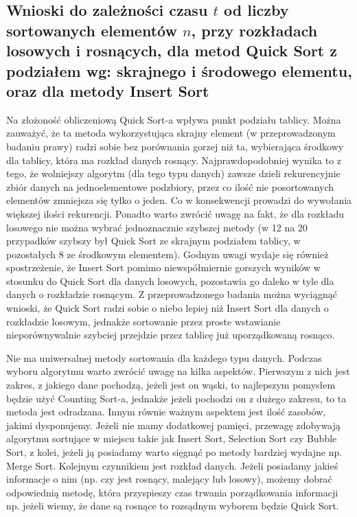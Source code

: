 \documentclass[polish,polish,a4paper]{article}
\begin{document}
\begin{spacing}{1.5}
\subsection{Wnioski do zależności czasu $t$ od liczby sortowanych elementów $n$, przy rozkładach losowych i rosnących, dla metod Quick Sort z podziałem wg: skrajnego i środowego elementu, oraz dla metody Insert Sort}

Na złożoność obliczeniową Quick Sort-a wpływa punkt podziału tablicy. Można zauważyć, że ta metoda wykorzystująca skrajny element (w przeprowadzonym badaniu prawy) radzi sobie bez porównania gorzej niż ta, wybierająca środkowy dla tablicy, która ma rozkład danych rosnący. Najprawdopodobniej wynika to z tego, że wolniejszy algorytm (dla tego typu danych) zawsze dzieli rekurencyjnie zbiór danych na jednoelementowe podzbiory, przez co ilość nie posortowanych elementów zmniejsza się tylko o jeden. Co w konsekwencji prowadzi do wywołania większej ilości rekurencji. Ponadto warto zwrócić uwagę na fakt, że dla rozkładu losowego nie można wybrać jednoznacznie szybszej metody (w 12 na 20 przypadków szybszy był Quick Sort ze skrajnym podziałem tablicy, w pozostałych 8 ze środkowym elementem). Godnym uwagi wydaje się również spostrzeżenie, że Insert Sort pomimo niewspółmiernie gorszych wyników w stosunku do Quick Sort dla danych losowych, pozostawia go daleko w tyle dla danych o rozkładzie rosnącym. Z przeprowadzonego badania można wyciągnąć wnioski, że Quick Sort radzi sobie o niebo lepiej niż Insert Sort dla danych o rozkładzie losowym, jednakże sortowanie przez proste wstawianie nieporównywalnie szybciej przejdzie przez tablicę już uporządkowaną rosnąco.

Nie ma uniwersalnej metody sortowania dla każdego typu danych. Podczas wyboru algorytmu warto zwrócić uwagę na kilka aspektów. Pierwszym z nich jest zakres, z jakiego dane pochodzą, jeżeli jest on wąski, to najlepszym pomysłem będzie użyć Counting Sort-a, jednakże jeżeli pochodzi on z dużego zakresu, to ta metoda jest odradzana. Innym równie ważnym aspektem jest ilość zasobów, jakimi dysponujemy. Jeżeli nie mamy dodatkowej pamięci, przewagę zdobywają algorytmu sortujące w miejscu takie jak Insert Sort, Selection Sort czy Bubble Sort, z kolei, jeżeli ją posiadamy warto sięgnąć po metody bardziej wydajne np. Merge Sort. Kolejnym czynnikiem jest rozkład danych. Jeżeli posiadamy jakieś informacje o nim (np. czy jest rosnący, malejący lub losowy), możemy dobrać odpowiednią metodę, która przyspieszy czas trwania porządkowania informacji np. jeżeli wiemy, że dane są rosnące to rozsądnym wyborem będzie Quick Sort.


\end{spacing}
\end{document}

